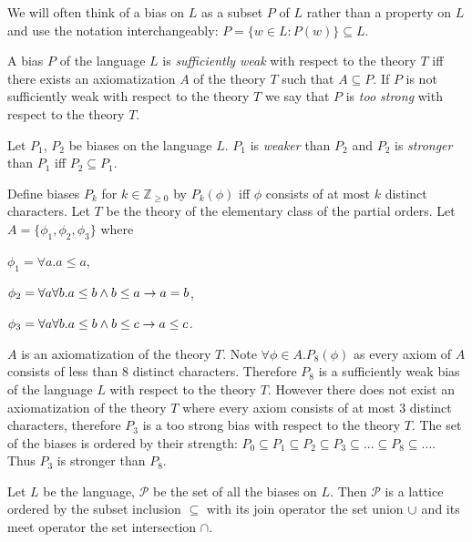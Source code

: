 \begin{remark}
We will often think of a bias on $L$ as a subset $P$ of $L$ rather than a property on $L$ and use the notation interchangeably:
$P=\{w \in L : P(w)\} \subseteq L$.
\end{remark}

\begin{defn}
A bias $P$ of the language $L$ is \emph{sufficiently weak} with respect to the theory $T$ iff there exists an axiomatization $A$ of the theory $T$ such that $A \subseteq P$. If $P$ is not sufficiently weak with respect to the theory $T$ we say that $P$ is \emph{too strong} with respect to the theory $T$.
\end{defn}

\begin{defn}
Let $P_1$, $P_2$ be biases on the language $L$. $P_1$ is \emph{weaker} than $P_2$ and $P_2$ is \emph{stronger} than $P_1$ iff $P_2 \subseteq P_1$.
\end{defn}

\begin{exmp}
Define biases $P_k$ for $k \in \mathbb{Z}_{\ge 0}$ by $P_k(\phi)$ iff $\phi$ consists of at most $k$ distinct characters. Let $T$ be the theory of the elementary class of the partial orders. Let $A=\{\phi_1, \phi_2, \phi_3\}$ where

$\phi_1=\forall a. a \le a$,

$\phi_2=\forall a \forall b. a \le b \wedge b \le a \to a=b$,

$\phi_3=\forall a \forall b. a \le b \wedge b \le c \to a \le c$.

$A$ is an axiomatization of the theory $T$. Note $\forall \phi \in A. P_8(\phi)$ as every axiom of $A$ consists of less than $8$ distinct characters. Therefore $P_8$ is a sufficiently weak bias of the language $L$ with respect to the theory $T$. However there does not exist an axiomatization of the theory $T$ where every axiom consists of at most $3$ distinct characters, therefore $P_3$ is a too strong bias with respect to the theory $T$. The set of the biases is ordered by their strength:
$P_0 \subseteq P_1 \subseteq P_2 \subseteq P_3 \subseteq ... \subseteq P_8 \subseteq ...$. Thus $P_3$ is stronger than $P_8$.
\end{exmp}

\begin{remark}
Let $L$ be the language, $\mathcal{P}$ be the set of all the biases on $L$. Then $\mathcal{P}$ is a lattice ordered by the subset inclusion $\subseteq$ with its join operator the set union $\cup$ and its meet operator the set intersection $\cap$.
\end{remark}

